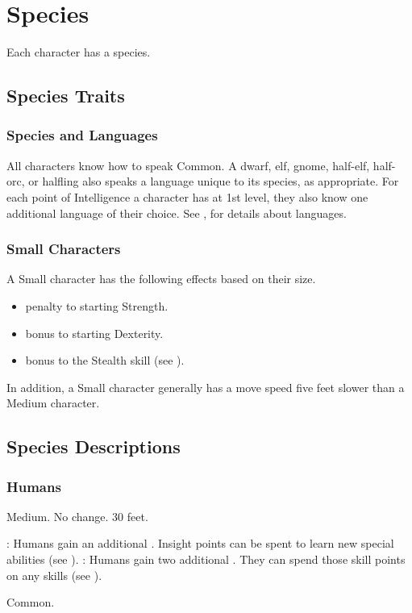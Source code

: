 \chapter{Species}\label{Species}

Each character has a species.

\section{Species Traits}

\subsection{Species and Languages}
All characters know how to speak Common. A dwarf, elf, gnome, half-elf, half-orc, or halfling also speaks a language unique to its species, as appropriate. For each point of Intelligence a character has at 1st level, they also know one additional language of their choice. See , for details about languages.

\subsection{Small Characters}\label{Small Characters}
A Small character has the following effects based on their size.
\begin{itemize}
    \item {} penalty to starting Strength.
    \item {} bonus to starting Dexterity.
    \item {} bonus to the Stealth skill (see ).
\end{itemize}

In addition, a Small character generally has a move speed five feet slower than a Medium character.

\section{Species Descriptions}

\subsection{Humans}
 Medium.
 No change.
 30 feet.
\begin{itemize}
    : Humans gain an additional .
        Insight points can be spent to learn new special abilities (see ).
    : Humans gain two additional . They can spend those skill points on any skills (see ).
\end{itemize}
 Common.

